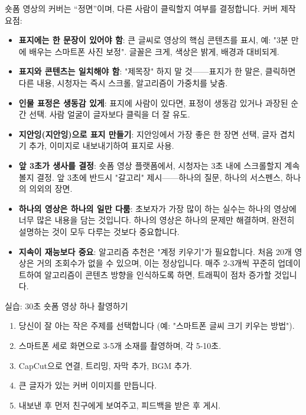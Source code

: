 
숏폼 영상의 커버는 “정면”이며, 다른 사람이 클릭할지 여부를 결정합니다. 커버 제작 요점:

\begin{itemize}
  \item \textbf{표지에는 한 문장이 있어야 함}: 큰 글씨로 영상의 핵심 콘텐츠를 표시, 예: "3분 만에 배우는 스마트폰 사진 보정". 글꼴은 크게, 색상은 밝게, 배경과 대비되게.
  \item \textbf{표지와 콘텐츠는 일치해야 함}: "제목장" 하지 말 것——표지가 한 말은, 클릭하면 다른 내용, 시청자는 즉시 스크롤, 알고리즘이 가중치를 낮춤.
  \item \textbf{인물 표정은 생동감 있게}: 표지에 사람이 있다면, 표정이 생동감 있거나 과장된 순간 선택. 사람 얼굴이 글자보다 클릭을 더 잘 유도.
  \item \textbf{지안잉(지안잉)으로 표지 만들기}: 지안잉에서 가장 좋은 한 장면 선택, 글자 겹치기 추가, 이미지로 내보내기하여 표지로 사용.
\end{itemize}


\begin{itemize}
  \item \textbf{앞 3초가 생사를 결정}: 숏폼 영상 플랫폼에서, 시청자는 3초 내에 스크롤할지 계속 볼지 결정. 앞 3초에 반드시 "갈고리" 제시——하나의 질문, 하나의 서스펜스, 하나의 의외의 장면.
  \item \textbf{하나의 영상은 하나의 일만 다룸}: 초보자가 가장 많이 하는 실수는 하나의 영상에 너무 많은 내용을 담는 것입니다. 하나의 영상은 하나의 문제만 해결하며, 완전히 설명하는 것이 모두 다루는 것보다 중요합니다.
  \item \textbf{지속이 재능보다 중요}: 알고리즘 추천은 "계정 키우기"가 필요합니다. 처음 20개 영상은 거의 조회수가 없을 수 있으며, 이는 정상입니다. 매주 2-3개씩 꾸준히 업데이트하여 알고리즘이 콘텐츠 방향을 인식하도록 하면, 트래픽이 점차 증가할 것입니다.
\end{itemize}

\begin{tcbpractice}{실습: 30초 숏폼 영상 하나 촬영하기}
\begin{enumerate}
  \item 당신이 잘 아는 작은 주제를 선택합니다 (예: "스마트폰 글씨 크기 키우는 방법").
  \item 스마트폰 세로 화면으로 3-5개 소재를 촬영하며, 각 5-10초.
  \item CapCut으로 연결, 트리밍, 자막 추가, BGM 추가.
  \item 큰 글자가 있는 커버 이미지를 만듭니다.
  \item 내보낸 후 먼저 친구에게 보여주고, 피드백을 받은 후 게시.
\end{enumerate}

\end{tcbpractice}

